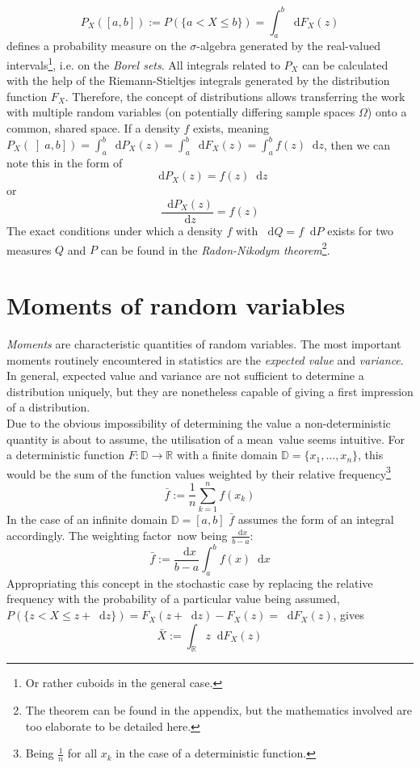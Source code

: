 \documentclass[12pt]{article}
\newcommand*\diff{\mathop{}\!\mathrm{d}}
\begin{document}
\[
P_X(\left[ a, b\right]) := P(\{a < X \leq b\}) = \int_a^b \diff F_X (z)
\]
defines a probability measure on the $\sigma$-algebra generated by the real-valued intervals\footnote{Or rather cuboids in the general case.}, i.e. on the \textit{Borel sets}. All integrals related to $P_X$ can be calculated with the help of the Riemann-Stieltjes integrals generated by the distribution function $F_X$. Therefore, the concept of distributions allows transferring the work with multiple random variables (on potentially differing sample spaces $\Omega$) onto a common, shared space. If a density $f$ exists, meaning $P_X(\left] a, b\right]) = \int_a^b \diff P_X(z)= \int_a^b \diff F_X(z) = \int_a^b f (z)\diff z$, then we can note this in the form of
\[
\diff P_X (z) = f (z) \diff z
\]
or
\[
\frac{\diff P_X(z)}{\diff z} = f (z)
\]
The exact conditions under which a density $f$ with $\diff Q = f \diff P$ exists for two measures $Q$ and $P$ can be found in the \textit{Radon-Nikodym theorem}\footnote{The theorem can be found in the appendix, but the mathematics involved are too elaborate to be detailed here.}.

\section{Moments of random variables}
\textit{Moments} are characteristic quantities of random variables. The most important moments routinely encountered in statistics are the \textit{expected value} and \textit{variance}. In general, expected value and variance are not sufficient to determine a distribution uniquely, but they are nonetheless capable of giving a first impression of a distribution.\\
Due to the obvious impossibility of determining the value a non-deterministic quantity is about to assume, the utilisation of a \glqq mean\grqq \ value seems intuitive.
For a deterministic function $F: \mathbb{D} \to \mathbb{R}$ with a finite domain $\mathbb{D} = \{ x_1, \dots , x_n\}$, this would be the sum of the function values weighted by their relative frequency\footnote{Being $\frac{1}{n}$ for all $x_k$ in the case of a deterministic function.}
\[
\bar{f}:= \frac{1}{n} \sum_{k = 1}^{n}f(x_k)
\]
In the case of an infinite domain $\mathbb{D} = \left[ a, b \right]$ $\bar{f}$ assumes the form of an integral accordingly. The weighting \glqq factor\grqq \ now being $\frac{\diff x}{b - a}$:
\[
\bar{f} := \frac{\diff x}{b - a} \int_a^b f(x) \diff x
\]
Appropriating this concept in the stochastic case by replacing the relative frequency with the probability of a particular value being assumed, $P(\{z < X \leq z + \diff z\}) = F_X(z + \diff z) - F_X (z) = \diff F_X(z)$, gives
\[
\bar{X} := \int_\mathbb{R} z \diff F_X(z)
\]
\end{document}
